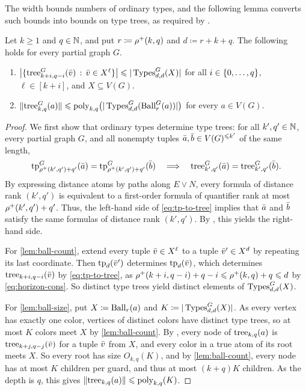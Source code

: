 The width bounds numbers of ordinary types, and the following lemma converts such bounds into bounds on type trees, as required by .

\begin{lemma}\label{lem:ball-tree-bound}
Let $k\ge1$ and $q\in\mathbb N$, and put $r\coloneqq\rho^+(k,q)$ and $d\coloneqq r+k+q$.
The following holds for every partial graph $G$.
\begin{enumerate}[label=(\roman*)]
\item\label{lem:ball-count}
$\bigl|\{\mathrm{tree}^G_{k+i,q-i}(\bar v) \,:\, \bar v\in X^{\ell} \}\bigr|
\leqslant|\operatorname{Types}^G_{d,d}(X)|$ for all $i\in\{0,\ldots,q\}$, $\ell\in [k+i]$, and $X\subseteq V(G)$.
\item\label{lem:ball-size}
$\lVert \mathrm{tree}^G_{k,q}(a)\rVert
\leqslant
\mathrm{poly}_{k,q}\bigl(|\operatorname{Types}^G_{d,d}(\operatorname{Ball}^G_r(a))|\bigr)$ for every $a\in V(G)$.
\end{enumerate}
\end{lemma}
\begin{proof}
We first show that ordinary types determine type trees: for all $k',q'\in\mathbb N$, every partial graph $G$, and all nonempty tuples $\bar a,\bar b\in V(G)^{\leqslant k'}$ of the same length,
\begin{equation}\label{eq:tp-to-tree}
\textnormal{tp}^G_{\rho^+(k',q')+q'}(\bar a)=\textnormal{tp}^G_{\rho^+(k',q')+q'}(\bar b)
\quad\Longrightarrow\quad
\mathrm{tree}^G_{k',q'}(\bar a)=\mathrm{tree}^G_{k',q'}(\bar b).
\end{equation}
By expressing distance atoms by paths along $E\lor N$, every \distFO formula of distance rank $(k',q')$ is equivalent to a first-order formula of quantifier rank at most $\rho^+(k',q')+q'$. Thus, the left-hand side of \eqref{eq:tp-to-tree} implies that $\bar a$ and $\bar b$ satisfy 
the same \distFO formulas of distance rank $(k',q')$.
By , this yields the right-hand side.

For \ref{lem:ball-count}, extend every tuple $\bar v\in X^\ell$ to a tuple $\bar v'\in X^d$ by repeating its last coordinate.
Then $\textnormal{tp}_d(\bar v')$ determines $\textnormal{tp}_d(\bar v)$, which determines $\mathrm{tree}_{k+i,q-i}(\bar v)$ by \eqref{eq:tp-to-tree}, as $\rho^+(k+i,q-i)+q-i\leqslant \rho^+(k,q)+q\leqslant d$ by \eqref{eq:horizon-cons}.
So distinct type trees yield distinct elements of $\operatorname{Types}^G_{d,d}(X)$.

For \ref{lem:ball-size}, put $X\coloneqq\operatorname{Ball}_r(a)$ and $K\coloneqq|\operatorname{Types}^G_{d,d}(X)|$.
As every vertex has exactly one color, vertices of distinct colors have distinct type trees, so at most $K$ colors meet $X$ by \ref{lem:ball-count}.
By , every node of $\mathrm{tree}_{k,q}(a)$ is $\mathrm{tree}_{k+j,q-j}(\bar v)$ for a tuple $\bar v$ from $X$, and every color in a true atom of its root meets $X$.
So every root has size $O_{k,q}(K)$, and by \ref{lem:ball-count}, every node has at most $K$ children per guard, and thus at most $(k+q)K$ children.
As the depth is $q$, this gives $\lVert \mathrm{tree}_{k,q}(a)\rVert\leqslant\mathrm{poly}_{k,q}(K)$.
\end{proof}

